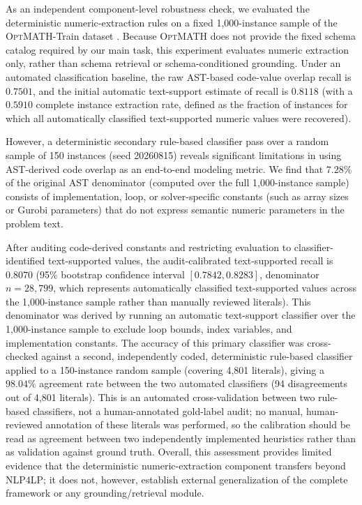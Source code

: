 \documentclass[pdflatex,sn-basic,Numbered]{sn-jnl}
\begin{document}
As an independent component-level robustness check, we evaluated the deterministic numeric-extraction rules on a fixed 1,000-instance sample of the \textsc{OptMATH}-Train dataset \cite{lu2025optmath}. Because \textsc{OptMATH} does not provide the fixed schema catalog required by our main task, this experiment evaluates numeric extraction only, rather than schema retrieval or schema-conditioned grounding. Under an automated classification baseline, the raw AST-based code-value overlap recall is $0.7501$, and the initial automatic text-support estimate of recall is $0.8118$ (with a $0.5910$ complete instance extraction rate, defined as the fraction of instances for which all automatically classified text-supported numeric values were recovered). 

However, a deterministic secondary rule-based classifier pass over a random sample of 150 instances (seed 20260815) reveals significant limitations in using AST-derived code overlap as an end-to-end modeling metric. We find that $7.28\%$ of the original AST denominator (computed over the full 1,000-instance sample) consists of implementation, loop, or solver-specific constants (such as array sizes or Gurobi parameters) that do not express semantic numeric parameters in the problem text.

After auditing code-derived constants and restricting evaluation to classifier-identified text-supported values, the audit-calibrated text-supported recall is $0.8070$ (95\% bootstrap confidence interval $[0.7842, 0.8283]$, denominator $n=28{,}799$, which represents automatically classified text-supported values across the 1,000-instance sample rather than manually reviewed literals). This denominator was derived by running an automatic text-support classifier over the 1,000-instance sample to exclude loop bounds, index variables, and implementation constants. The accuracy of this primary classifier was cross-checked against a second, independently coded, deterministic rule-based classifier applied to a 150-instance random sample (covering 4,801 literals), giving a $98.04\%$ agreement rate between the two automated classifiers (94 disagreements out of 4,801 literals). This is an automated cross-validation between two rule-based classifiers, not a human-annotated gold-label audit; no manual, human-reviewed annotation of these literals was performed, so the calibration should be read as agreement between two independently implemented heuristics rather than as validation against ground truth. Overall, this assessment provides limited evidence that the deterministic numeric-extraction component transfers beyond \textsc{NLP4LP}; it does not, however, establish external generalization of the complete framework or any grounding/retrieval module.
\end{document}
